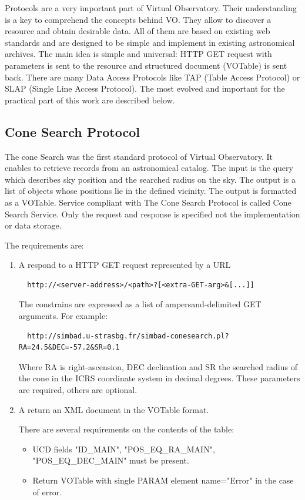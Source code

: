 Protocols are a very important part of Virtual Observatory. Their
understanding is a key to comprehend the concepts behind VO. They
allow to discover a resource and obtain desirable data. All of them
are based on existing web standards and are designed to be simple and
implement in existing astronomical archives. The main idea is simple
and universal: HTTP GET request with parameters is sent to the
resource and structured document (VOTable) is sent back. There are
many Data Access Protocols like TAP (Table Access Protocol) or SLAP
(Single Line Access Protocol). The most evolved and important for the
practical part of this work are described below.

\subsection{Cone Search Protocol} \label{sec:csp} 

The cone Search was the first standard protocol of Virtual
Observatory. It enables to retrieve records from an astronomical
catalog. The input is the query which describes sky position and the
searched radius on the sky. The output is a list of objects whose
positions lie in the defined vicinity. The output is formatted as a
VOTable. Service compliant with The Cone Search Protocol is called
Cone Search Service. Only the request and response is specified not
the implementation or data storage.


The requirements are:


\begin{enumerate}
\item A respond to a HTTP GET request represented by a URL 

\begin{lstlisting}
  http://<server-address>/<path>?[<extra-GET-arg>&[...]]
\end{lstlisting}

The constrains are expressed as a list of ampersand-delimited GET
arguments. For example:

\begin{lstlisting}
  http://simbad.u-strasbg.fr/simbad-conesearch.pl?RA=24.5&DEC=-57.2&SR=0.1
\end{lstlisting}

Where RA is right-ascension, DEC declination and SR the searched
radius of the cone in the ICRS coordinate system in decimal
degrees. These parameters are required, others are optional.

\item A return an XML document in the VOTable format.

  There are several requirements on the contents of the table:

  \begin{itemize}
  \item UCD fields "ID\_MAIN", "POS\_EQ\_RA\_MAIN", "POS\_EQ\_DEC\_MAIN" must
    be present.
  \item Return VOTable with single PARAM element name="Error" in the
    case of error.
  \end{itemize}

\end{enumerate}

